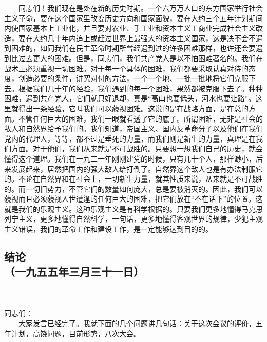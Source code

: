\documentclass[cn,11pt,chinese]{elegantbook}
\def\myformat#1{\hfil\hfil #1}
\begin{document}
　　同志们！我们现在是处在新的历史时期。一个六万万人口的东方国家举行社会主义革命，要在这个国家里改变历史方向和国家面貌，要在大约三个五年计划期间内使国家基本上工业化，并且要对农业、手工业和资本主义工商业完成社会主义改造，要在大约几十年内追上或赶过世界上最强大的资本主义国家，这是决不会不遇到困难的，如同我们在民主革命时期所曾经遇到过的许多困难那样，也许还会要遇到比过去更大的困难。但是，同志们，我们共产党人是以不怕困难著名的。我们在战术上必须重视一切困难。对于每一个具体的困难，我们都要采取认真对待的态度，创造必要的条件，讲究对付的方法，一个一个地、一批一批地将它们克服下去。根据我们几十年的经验，我们遇到的每一个困难，果然都被克服下去了。种种困难，遇到共产党人，它们就只好退却，真是“高山也要低头，河水也要让路”。这里就得出一条经验，它叫我们可以藐视困难。这说的是在战略方面，是在总的方面。不管任何巨大的困难，我们一眼就看透了它的底子。所谓困难，无非是社会的敌人和自然界给予我们的。我们知道，帝国主义、国内反革命分子以及他们在我们党内的代理人，等等，都不过是垂死的力量，而我们则是新生的力量，真理是在我们方面。对于他们，我们从来就是不可战胜的。只要想一想我们自己的历史，就会懂得这个道理。我们在一九二一年刚刚建党的时候，只有几十个人，那样渺小，后来发展起来，居然把国内的强大敌人给打倒了。自然界这个敌人也是有办法制服它的。不论在自然界和在社会上，一切新生力量，就其性质来说，从来就是不可战胜的。而一切旧势力，不管它们的数量如何庞大，总是要被消灭的。因此，我们可以藐视而且必须藐视人世遭逢的任何巨大的困难，把它们放在“不在话下”的位置。这就是我们的乐观主义。这种乐观主义是有科学根据的。只要我们更多地懂得马克思列宁主义，更多地懂得自然科学，一句话，更多地懂得客观世界的规律，少犯主观主义错误，我们的革命工作和建设工作，是一定能够达到目的的。\\
\subsection*{\myformat{结论}\\\myformat{（一九五五年三月三十一日）}}
\\~~\\
同志们：\\
　　大家发言已经完了。我就下面的几个问题讲几句话：关于这次会议的评价，五年计划，高饶问题，目前形势，八次大会。\\
\end{document}
